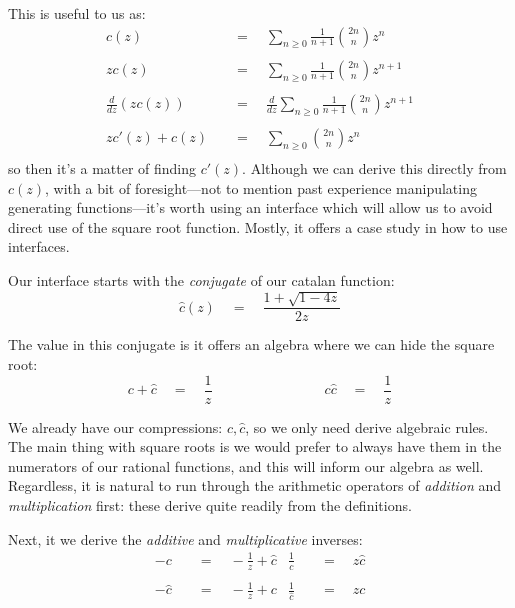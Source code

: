 \documentclass[twoside]{article}
\newcommand{\equals}{\ensuremath{\quad =\quad}}
\newcommand{\fourqquad}{\ensuremath{\qquad\qquad\qquad\qquad}}
\newcommand{\cat}{\ensuremath{c}}
\newcommand{\chat}{\ensuremath{\hat{c}}}
\begin{document}
This is useful to us as:
\begin{align*}
\cat(z)			& \equals \sum_{n\ge 0}\frac{1}{n+1}{2n \choose n}z^n				\\
													\\
z\cat(z)		& \equals \sum_{n\ge 0}\frac{1}{n+1}{2n \choose n}z^{n+1}			\\
													\\
\frac{d}{dz}(z\cat(z))	& \equals \frac{d}{dz}\sum_{n\ge 0}\frac{1}{n+1}{2n \choose n}z^{n+1}		\\
													\\
z\cat'(z)+\cat(z)	& \equals \sum_{n\ge 0}{2n \choose n}z^n					\\
\end{align*}
so then it's a matter of finding $ \cat'(z) $. Although we can derive this directly from $ c(z) $, with a bit of
foresight---not to mention past experience manipulating generating functions---it's worth using an interface
which will allow us to avoid direct use of the square root function. Mostly, it offers a case study in how to
use interfaces.

Our interface starts with the \emph{conjugate} of our catalan function:
$$ \chat(z) \equals \frac{1+\sqrt{1-4z}}{2z} $$

The value in this conjugate is it offers an algebra where we can hide the square root:
$$ \cat+\chat \equals \frac{1}{z} \fourqquad \cat\chat \equals \frac{1}{z} $$

We already have our compressions: $ \cat, \chat $, so we only need derive algebraic rules. The main thing with square
roots is we would prefer to always have them in the numerators of our rational functions, and this will inform our algebra
as well. Regardless, it is natural to run through the arithmetic operators of \emph{addition} and \emph{multiplication} first:
these derive quite readily from the definitions.

Next, it we derive the \emph{additive} and \emph{multiplicative} inverses:
\begin{align*}
-\cat		& \equals -\frac{1}{z}+\chat		& \frac{1}{\cat}	& \equals z\chat	\\
													\\
-\chat		& \equals -\frac{1}{z}+\cat		& \frac{1}{\chat}	& \equals z\cat		\\
\end{align*}
\end{document}
